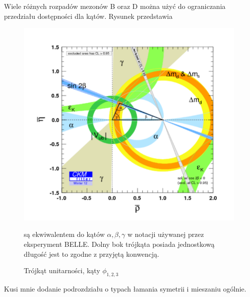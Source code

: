 Wiele różnych rozpadów mezonów B oraz D można użyć do ograniczania przedziału dostępności dla kątów. Rysunek przedstawia 
 


 \begin{figure}[ht]
 \centering
 \includegraphics[scale=0.7]{rozdzial1/triangle.png}
 \caption{Trójkąt unitarności, kąty $ \phi_{1,2,3}$} są ekwiwalentem do kątów $\alpha,\beta,\gamma$ w notacji używanej przez eksperyment BELLE. Dolny bok trójkąta posiada jednostkową długość jest to zgodne z przyjętą konwencją. 
 \label{fig:trojkat wyniki}
\end{figure}



Kusi mnie dodanie podrozdziału o typach łamania symetrii i mieszaniu ogólnie.
